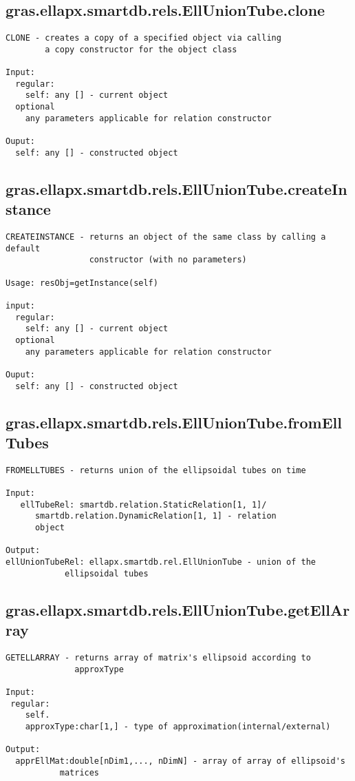 \subsection{\texorpdfstring{gras.ellapx.smartdb.rels.EllUnionTube.clone}{clone}}\label{method:gras.ellapx.smartdb.rels.EllUnionTube.clone}
\begin{verbatim}
CLONE - creates a copy of a specified object via calling
        a copy constructor for the object class

Input:
  regular:
    self: any [] - current object
  optional
    any parameters applicable for relation constructor

Ouput:
  self: any [] - constructed object
\end{verbatim}
\subsection{\texorpdfstring{gras.ellapx.smartdb.rels.EllUnionTube.createInstance}{createInstance}}\label{method:gras.ellapx.smartdb.rels.EllUnionTube.createInstance}
\begin{verbatim}
CREATEINSTANCE - returns an object of the same class by calling a default
                 constructor (with no parameters)

Usage: resObj=getInstance(self)

input:
  regular:
    self: any [] - current object
  optional
    any parameters applicable for relation constructor

Ouput:
  self: any [] - constructed object
\end{verbatim}
\subsection{\texorpdfstring{gras.ellapx.smartdb.rels.EllUnionTube.fromEllTubes}{fromEllTubes}}\label{method:gras.ellapx.smartdb.rels.EllUnionTube.fromEllTubes}
\begin{verbatim}
FROMELLTUBES - returns union of the ellipsoidal tubes on time

Input:
   ellTubeRel: smartdb.relation.StaticRelation[1, 1]/
      smartdb.relation.DynamicRelation[1, 1] - relation
      object

Output:
ellUnionTubeRel: ellapx.smartdb.rel.EllUnionTube - union of the
            ellipsoidal tubes
\end{verbatim}
\subsection{\texorpdfstring{gras.ellapx.smartdb.rels.EllUnionTube.getEllArray}{getEllArray}}\label{method:gras.ellapx.smartdb.rels.EllUnionTube.getEllArray}
\begin{verbatim}
GETELLARRAY - returns array of matrix's ellipsoid according to
              approxType

Input:
 regular:
    self.
    approxType:char[1,] - type of approximation(internal/external)

Output:
  apprEllMat:double[nDim1,..., nDimN] - array of array of ellipsoid's
           matrices
\end{verbatim}
